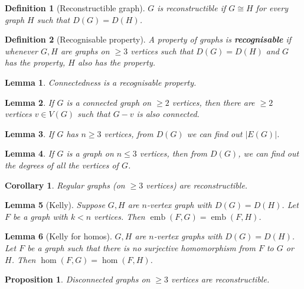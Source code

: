 \documentclass{article}
\newcommand{\size}[1]{|#1|}
\newcommand{\st}{such that }
\DeclareMathOperator*{\emb}{emb}
\newtheorem*{definition}{Definition}
\newtheorem*{proposition}{Proposition}
\newtheorem*{lemma}{Lemma}
\newtheorem*{corollary}{Corollary}
\begin{document}
\begin{definition}[Reconstructible graph]
    $ G $ is reconstructible if $ G \cong H $ for every graph $ H $ \st $ D(G) = D(H) $.
\end{definition}

\begin{definition}[Recognisable property]
    A property of graphs is \textbf{recognisable} if whenever $ G, H $ are graphs on $ \geq 3 $ vertices \st $ D(G) = D(H) $ and
    $ G $ has the property, $ H $ also has the property.
\end{definition}

\begin{lemma}
    Connectedness is a recognisable property.
\end{lemma}

\begin{lemma}
    If $ G $ is a connected graph on $ \geq 2 $ vertices, then there are $ \geq 2 $ vertices $ v \in V(G) $ \st $ G - v $ is also connected.
\end{lemma}

\begin{lemma}
    If $ G $ has $ n \geq 3 $ vertices, from $ D(G) $ we can find out $ \size{E(G)} $.
\end{lemma}

\begin{lemma}
    If $ G $ is a graph on $ n \leq 3 $ vertices, then from $ D(G) $, we can find out the degrees of all the vertices of $ G $.
\end{lemma}

\begin{corollary}
    Regular graphs (on $ \geq 3 $ vertices) are reconstructible.
\end{corollary}

\begin{lemma}[Kelly]
    Suppose $ G, H $ are $ n $-vertex graph with $ D(G) = D(H) $. Let $ F $ be a graph with $ k < n $ vertices. Then
    $ \emb(F, G) = \emb(F, H) $.
\end{lemma}

\begin{lemma}[Kelly for homos]
    $ G, H $ are $ n $-vertex graphs with $ D(G) = D(H) $. Let $ F $ be a graph \st there is no surjective homomorphism from $ F $ to
    $ G $ or $ H $. Then $ \hom(F, G) = \hom(F, H)$.
\end{lemma}

\begin{proposition}
    Disconnected graphs on $ \geq 3 $ vertices are reconstructible.
\end{proposition}
\end{document}

